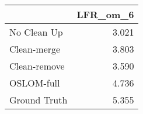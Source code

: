 \begin{tabular}{lr}
\toprule
{} & LFR_om_6 \\
\midrule
No Clean Up  &    3.021 \\
Clean-merge  &    3.803 \\
Clean-remove &    3.590 \\
OSLOM-full   &    4.736 \\
Ground Truth &    5.355 \\
\bottomrule
\end{tabular}
